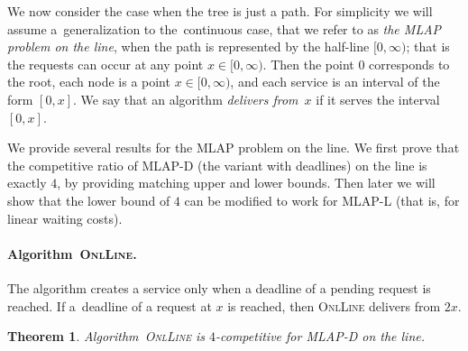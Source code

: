 \documentclass[a4paper]{article}
\newtheorem{theorem}{Theorem}[section]
\newcommand{\DLINE}{\mbox{\textsc{OnlLine}}}
\newcommand{\MLAP}{\mbox{\rm\textsf{MLAP}}}
\newcommand{\MLAPL}{\mbox\rm{\textsf{MLAP-L}}}
\newcommand{\MLAPD}{\mbox{\rm\textsf{MLAP-D}}}
\begin{document}
We now consider the case when the tree is just a path. For simplicity we will
assume a~generalization to the~continuous case, that we refer to as 
\emph{the {\MLAP} problem on the line}, when the path is represented by the half-line
$[0,\infty)$; that is the requests can occur at any point $x\in [0,\infty)$. Then
the point $0$ corresponds to the root, each node is a point $x\in [0,\infty)$,
and each service is an interval of the form $[0,x]$.
We say that an algorithm {\em delivers from}~$x$ if it serves the interval $[0,x]$.

We provide several results for the {\MLAP} problem on the line.
We first prove
that the competitive ratio of {\MLAPD} (the variant with deadlines) on
the line is exactly $4$, by providing matching upper and lower
bounds. Then later we will show that the lower bound of $4$ can be
modified to work for {\MLAPL} (that is, for linear waiting costs).


\paragraph{Algorithm~{\DLINE}.}

The algorithm creates a service only when a deadline of a pending request is reached.
If a~deadline of a request at $x$ is reached, then {\DLINE} delivers from $2x$.


\begin{theorem}
Algorithm~{\DLINE} is $4$-competitive for {\MLAPD} on the line.
\end{theorem}
\end{document}
